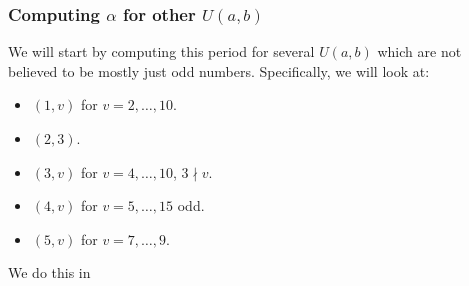 \documentclass{article}
\theoremstyle{definition}
\theoremstyle{remark}
\numberwithin{equation}{section}
\begin{document}
\subsubsection{Computing $\alpha$ for other $U(a,b)$}

We will start by computing this period for several $U(a,b)$ which are
not believed to be mostly just odd numbers.  Specifically, we will
look at: 

\begin{itemize}
\item $(1,v)$ for $v = 2, \ldots, 10$.
\item $(2,3)$.
\item $(3,v)$ for $v = 4, \ldots, 10$, $3 \nmid v$.
\item $(4,v)$ for $v = 5, \ldots, 15$ odd.
\item $(5,v)$ for $v = 7, \ldots, 9$.
\end{itemize}

We do this in 
\end{document}

